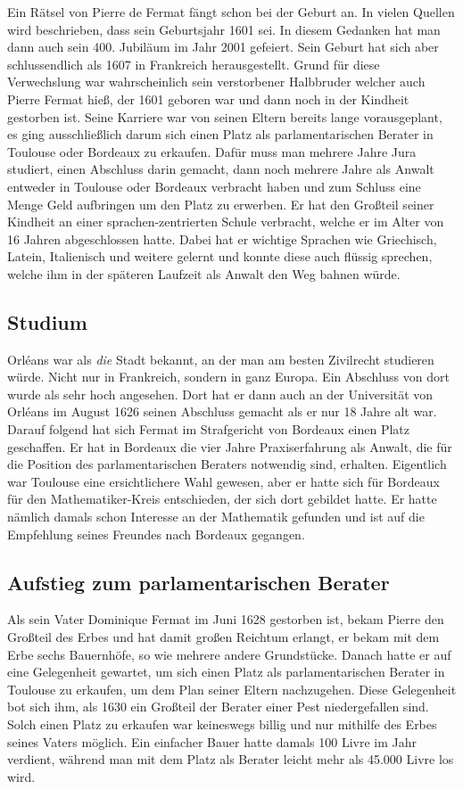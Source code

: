         Ein Rätsel von Pierre de Fermat fängt schon bei der Geburt an. In vielen Quellen wird beschrieben, dass sein Geburtsjahr 1601 sei. In diesem Gedanken hat man dann auch sein 400. Jubiläum im Jahr 2001 gefeiert. Sein Geburt hat sich aber schlussendlich als 1607 in Frankreich herausgestellt. \cite{whenWasFermatBorn} Grund für diese Verwechslung war wahrscheinlich sein verstorbener Halbbruder welcher auch Pierre Fermat hieß, der 1601 geboren war und dann noch in der Kindheit gestorben ist. \cite{famousScientistsFermat} Seine Karriere war von seinen Eltern bereits lange vorausgeplant, es ging ausschließlich darum sich einen Platz als parlamentarischen Berater in Toulouse oder Bordeaux zu erkaufen. Dafür muss man mehrere Jahre Jura studiert, einen Abschluss darin gemacht, dann noch mehrere Jahre als Anwalt entweder in Toulouse oder Bordeaux verbracht haben und zum Schluss eine Menge Geld aufbringen um den Platz zu erwerben. Er hat den Großteil seiner Kindheit an einer sprachen-zentrierten Schule verbracht, welche er im Alter von 16 Jahren abgeschlossen hatte. Dabei hat er wichtige Sprachen wie Griechisch, Latein, Italienisch und weitere gelernt und konnte diese auch flüssig sprechen, welche ihm in der späteren Laufzeit als Anwalt den Weg bahnen würde.

    \subsection{Studium} \label{sec:studium}
        Orléans war als \textit{die} Stadt bekannt, an der man am besten Zivilrecht studieren würde. Nicht nur in Frankreich, sondern in ganz Europa. Ein Abschluss von dort wurde als sehr hoch angesehen. Dort hat er dann auch an der Universität von Orléans im August 1626 seinen Abschluss gemacht als er nur 18 Jahre alt war. Darauf folgend hat sich Fermat im Strafgericht von Bordeaux einen Platz geschaffen. Er hat in Bordeaux die vier Jahre Praxiserfahrung als Anwalt, die für die Position des parlamentarischen Beraters notwendig sind, erhalten. Eigentlich war Toulouse eine ersichtlichere Wahl gewesen, aber er hatte sich für Bordeaux für den Mathematiker-Kreis entschieden, der sich dort gebildet hatte. Er hatte nämlich damals schon Interesse an der Mathematik gefunden und ist auf die Empfehlung seines Freundes nach Bordeaux gegangen.

    \subsection{Aufstieg zum parlamentarischen Berater} \label{sec:aufstieg}
        Als sein Vater Dominique Fermat im Juni 1628 gestorben ist, bekam Pierre den Großteil des Erbes und hat damit großen Reichtum erlangt, er bekam mit dem Erbe sechs Bauernhöfe, so wie mehrere andere Grundstücke. Danach hatte er auf eine Gelegenheit gewartet, um sich einen Platz als parlamentarischen Berater in Toulouse zu erkaufen, um dem Plan seiner Eltern nachzugehen. Diese Gelegenheit bot sich ihm, als 1630 ein Großteil der Berater einer Pest niedergefallen sind. Solch einen Platz zu erkaufen war keineswegs billig und nur mithilfe des Erbes seines Vaters möglich. Ein einfacher Bauer hatte damals 100 Livre im Jahr verdient, während man mit dem Platz als Berater leicht mehr als 45.000 Livre los wird.

